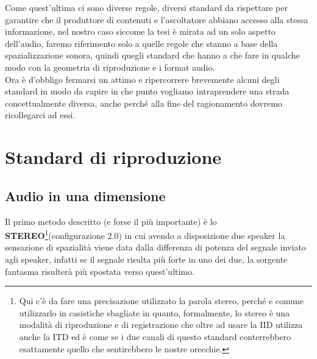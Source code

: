 \documentclass[12pt,a4paper]{report}
\begin{document}
Come quest'ultima ci sono diverse regole, diversi standard da rispettare per garantire che il produttore di contenuti e l'ascoltatore abbiano accesso alla stessa informazione, nel nostro caso siccome la tesi è mirata ad un solo aspetto dell'audio, faremo riferimento solo a quelle regole che stanno a base della spazializzazione sonora, quindi quegli standard che hanno a che fare in qualche modo con la geometria di riproduzione e i format audio.\\

Ora è d'obbligo fermarsi un attimo e ripercorrere brevemente alcuni degli standard in modo da capire in che punto vogliamo intraprendere una strada concettualmente diversa, anche perché alla fine del ragionamento dovremo ricollegarci ad essi.


\section{Standard di riproduzione}\label{metodi}

\subsection{Audio in una dimensione}

Il primo metodo descritto (e forse il più importante) è lo \textbf{STEREO}\footnote{Qui c'è da fare una precisazione utilizzato la parola stereo, perché e comune utilizzarlo in casistiche sbagliate in quanto, formalmente, lo stereo è una modalità di riproduzione e di registrazione che oltre ad usare la IID utilizza anche la ITD ed è come se i due canali di questo standard conterrebbero esattamente quello che sentirebbero le nostre orecchie.}(configurazione 2.0) in cui avendo a disposizione due speaker la sensazione di spazialità viene data dalla differenza di potenza del segnale inviato agli speaker, infatti se il segnale risulta più forte in uno dei due, la sorgente fantasma risulterà più spostata verso quest'ultimo.\\

\end{document}
